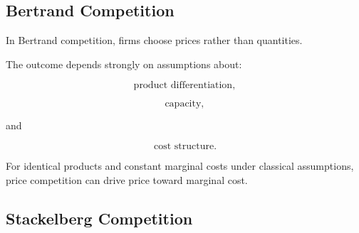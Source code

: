 
\subsection{Bertrand Competition}
\label{subsec:bertrand-competition}

In Bertrand competition, firms choose prices rather than quantities.

The outcome depends strongly on assumptions about:

\[
\boxed{
\text{product differentiation},
}
\]

\[
\boxed{
\text{capacity},
}
\]

and

\[
\boxed{
\text{cost structure}.
}
\]

For identical products and constant marginal costs under classical
assumptions, price competition can drive price toward marginal cost.

\subsection{Stackelberg Competition}
\label{subsec:stackelberg-competition}

